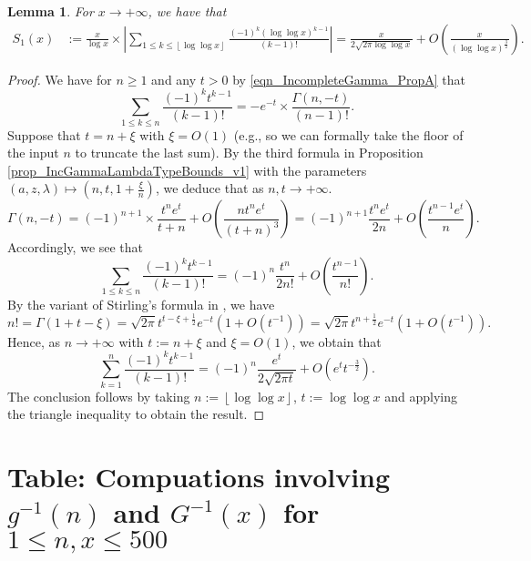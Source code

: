 \documentclass[11pt,reqno,a4letter]{article}
\numberwithin{figure}{section}
\numberwithin{table}{section}
\newcommand{\cf}{\textit{cf.\ }}
\newcommand{\floor}[1]{\left\lfloor #1 \right\rfloor}
\theoremstyle{plain}
\newtheorem{lemma}[theorem]{Lemma}
\numberwithin{theorem}{section}
\theoremstyle{definition}
\begin{document}
\begin{lemma}
\label{lemma_ConvenientIncGammaFuncTypePartialSumAsymptotics_v2}
For $x \rightarrow +\infty$, we have that 
\begin{align*}
S_1(x) & := \frac{x}{\log x} \times \left\lvert \sum_{1 \leq k \leq \floor{\log\log x}} 
     \frac{(-1)^k (\log\log x)^{k-1}}{(k-1)!} \right\rvert 
     = \frac{x}{2\sqrt{2\pi \log\log x}} + O\left(\frac{x}{(\log\log x)^{\frac{3}{2}}}\right). 
\end{align*}
\end{lemma}
\begin{proof}
We have for $n \geq 1$ and any $t > 0$ by 
\eqref{eqn_IncompleteGamma_PropA} that 
\[
\sum_{1 \leq k \leq n} \frac{(-1)^k t^{k-1}}{(k-1)!} = -e^{-t} \times 
     \frac{\Gamma(n, -t)}{(n-1)!}. 
\]
Suppose that $t = n + \xi$ with $\xi = O(1)$ (e.g., so we can 
formally take the floor of the input $n$ to truncate the last sum). 
By the third formula 
in Proposition \ref{prop_IncGammaLambdaTypeBounds_v1} 
with the parameters $(a, z, \lambda) \mapsto \left(n, t, 1 + \frac{\xi}{n}\right)$, 
we deduce that as $n,t \rightarrow +\infty$. 
\begin{equation}
\label{eqn_ProofTag_lemma_ConvenientIncGammaFuncTypePartialSumAsymptotics_v2}
\Gamma(n, -t) = (-1)^{n+1} \times \frac{t^n e^{t}}{t+n} + 
     O\left(\frac{n t^n e^{t}}{(t+n)^3}\right) = 
     (-1)^{n+1} \frac{t^n e^t}{2n} + O\left(\frac{t^{n-1} e^t}{n}\right). 
\end{equation}
Accordingly, we see that 
\[
\sum_{1 \leq k \leq n} \frac{(-1)^k t^{k-1}}{(k-1)!} = 
     (-1)^{n} \frac{t^n}{2n!} + O\left(\frac{t^{n-1}}{n!}\right). 
\]
By the variant of Stirling's formula in \cite[\cf Eq.\ (5.11.8)]{NISTHB}, we have 
\[
n! = \Gamma(1 + t - \xi) = \sqrt{2\pi} t^{t-\xi+\frac{1}{2}} e^{-t} \left(1 + O(t^{-1})\right) = 
     \sqrt{2\pi} t^{n+\frac{1}{2}} e^{-t} \left(1 + O(t^{-1})\right). 
\]
Hence, as $n \rightarrow +\infty$ with $t := n + \xi$ and $\xi = O(1)$, we obtain that 
\[
\sum_{k=1}^{n} \frac{(-1)^k t^{k-1}}{(k-1)!} = (-1)^n \frac{e^t}{2 \sqrt{2\pi t}} + 
     O\left(e^t t^{-\frac{3}{2}}\right). 
\]
The conclusion follows by taking $n := \floor{\log\log x}$, 
$t := \log\log x$ and applying the triangle inequality 
to obtain the result. 
\end{proof}

\newpage
\section{Table: Compuations involving $g^{-1}(n)$ and $G^{-1}(x)$ for $1 \leq n,x \leq 500$} 
\label{table_conjecture_Mertens_ginvSeq_approx_values}
\end{document}
